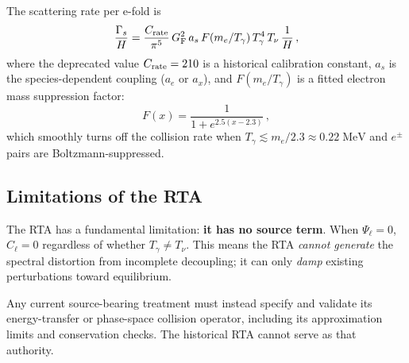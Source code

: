 The scattering rate per e-fold is
\begin{equation}
\frac{\Gamma_s}{H} = \frac{C_{\rm rate}}{\pi^5}\,G_{\rm F}^2\,a_s\,F(m_e/T_\gamma)\,T_\gamma^4\,T_\nu\,\frac{1}{H}\,,
\end{equation}
where the deprecated value $C_{\rm rate} = 210$ is a historical calibration constant, $a_s$ is the species-dependent coupling ($a_e$ or $a_x$), and $F(m_e/T_\gamma)$ is a fitted electron mass suppression factor:
\begin{equation}
F(x) = \frac{1}{1 + e^{2.5(x - 2.3)}}\,,
\end{equation}
which smoothly turns off the collision rate when $T_\gamma \lesssim m_e/2.3 \approx 0.22\;\mathrm{MeV}$ and $e^\pm$ pairs are Boltzmann-suppressed.

\subsection{Limitations of the RTA}

The RTA has a fundamental limitation: \textbf{it has no source term}.  When $\Psi_\ell = 0$, $C_\ell = 0$ regardless of whether $T_\gamma \neq T_\nu$.  This means the RTA \emph{cannot generate} the spectral distortion from incomplete decoupling; it can only \emph{damp} existing perturbations toward equilibrium.

Any current source-bearing treatment must instead specify and validate its energy-transfer or phase-space collision operator, including its approximation limits and conservation checks.  The historical RTA cannot serve as that authority.


